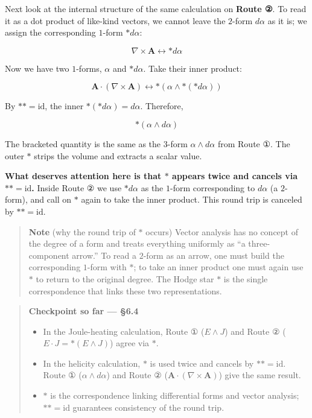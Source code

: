 \documentclass[a4paper,12pt,openany]{book}
\begin{document}
Next look at the internal structure of the same calculation on
\textbf{Route ②}. To read it as a dot product of like-kind vectors, we
cannot leave the \(2\)-form \(d\alpha\) as it is; we assign the
corresponding \(1\)-form \(\ast d\alpha\):

\[\nabla \times \mathbf{A} \longleftrightarrow \ast d\alpha\]

Now we have two \(1\)-forms, \(\alpha\) and \(\ast d\alpha\). Take their
inner product:

\[\mathbf{A} \cdot (\nabla \times \mathbf{A}) \longleftrightarrow \ast(\alpha \wedge \ast(\ast d\alpha))\]

By \(\ast\ast = \mathrm{id}\), the inner
\(\ast(\ast d\alpha) = d\alpha\). Therefore,

\[\ast(\alpha \wedge d\alpha)\]

The bracketed quantity is the same as the \(3\)-form
\(\alpha \wedge d\alpha\) from Route ①. The outer \(\ast\) strips the
volume and extracts a scalar value.

\textbf{What deserves attention here is that $\ast$ appears twice and cancels via $\ast\ast = \mathrm{id}$.}
Inside Route ② we use \(\ast d\alpha\) as the \(1\)-form corresponding
to \(d\alpha\) (a \(2\)-form), and call on \(\ast\) again to take the
inner product. This round trip is canceled by
\(\ast\ast = \mathrm{id}\).

\begin{quote}
\textbf{Note} (why the round trip of \(\ast\) occurs) Vector analysis
has no concept of the degree of a form and treats everything uniformly
as ``a three-component arrow.'' To read a \(2\)-form as an arrow, one
must build the corresponding \(1\)-form with \(\ast\); to take an inner
product one must again use \(\ast\) to return to the original degree.
The Hodge star \(\ast\) is the single correspondence that links these
two representations.
\end{quote}

\begin{quote}
\textbf{Checkpoint so far — §6.4}

\begin{itemize}
\item
  In the Joule-heating calculation, Route ① (\(E \wedge J\)) and Route ②
  (\(E \cdot J = \ast(E \wedge J)\)) agree via \(\ast\).
\item
  In the helicity calculation, \(\ast\) is used twice and cancels by
  \(\ast\ast = \mathrm{id}\). Route ① (\(\alpha \wedge d\alpha\)) and
  Route ② (\(\mathbf{A} \cdot (\nabla \times \mathbf{A})\)) give the
  same result.
\item
  \(\ast\) is the correspondence linking differential forms and vector
  analysis; \(\ast\ast = \mathrm{id}\) guarantees consistency of the
  round trip.
\end{itemize}
\end{quote}
\end{document}
